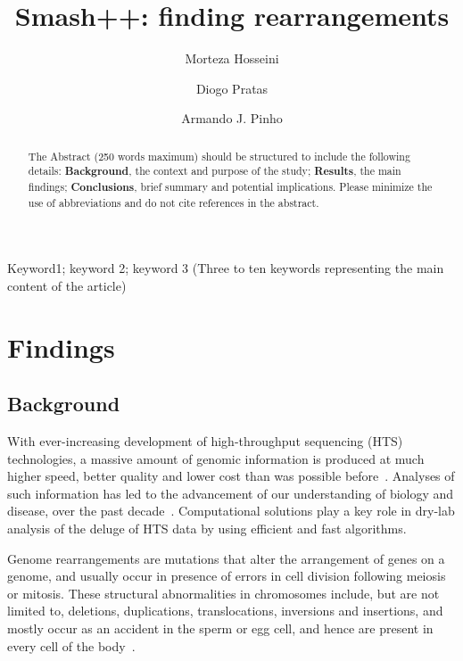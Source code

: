 \documentclass[a4paper,num-refs]{oup-contemporary}
\title{Smash++: finding rearrangements}
\author[1,\authfn{1}]{Morteza Hosseini}
\author[2,3,\authfn{1}]{Diogo Pratas}
\author[2,\authfn{1}]{Armando J. Pinho}
\affil[1,2]{IEETA/DETI, University of Aveiro, Portugal}
\affil[3]{Department of Virology, University of Helsinki, Finland}
\begin{document}
\begin{frontmatter}
\maketitle
\begin{abstract}
The Abstract (250 words maximum) should be structured to include the following details: \textbf{Background}, the context and purpose of the study; \textbf{Results}, the main findings; \textbf{Conclusions}, brief summary and potential implications. Please minimize the use of abbreviations and do not cite references in the abstract.
\end{abstract}

\begin{keywords}
Keyword1; keyword 2; keyword 3 (Three to ten keywords representing the main content of the article)
\end{keywords}
\end{frontmatter}


\section{Findings}

\subsection{Background}
With ever-increasing development of high-throughput sequencing (HTS) technologies, a massive amount of genomic information is produced at much higher speed, better quality and lower cost than was possible before~\cite{reuter2015high}. Analyses of such information has led to the advancement of our understanding of biology and disease, over the past decade~\cite{villamor2019high,rego2019high}. Computational solutions play a key role in dry-lab analysis of the deluge of HTS data by using efficient and fast algorithms.

Genome rearrangements are mutations that alter the arrangement of genes on a genome, and usually occur in presence of errors in cell division following meiosis or mitosis. These structural abnormalities in chromosomes include, but are not limited to, deletions, duplications, translocations, inversions and insertions, and mostly occur as an accident in the sperm or egg cell, and hence are present in every cell of the body~\cite{hartmann2018genome,gardner2018gardner}.
\end{document}
